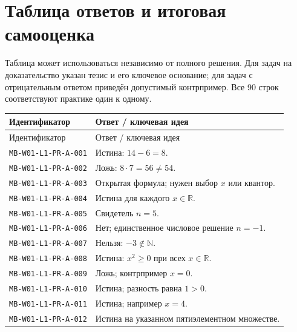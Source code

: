 \documentclass[11pt,a4paper,openany]{book}
\newcommand{\muid}[1]{\texttt{\footnotesize #1}}
\begin{document}
\chapter{Таблица ответов и итоговая самооценка}
\begin{keybox}Таблица может использоваться независимо от полного решения. Для задач на доказательство указан тезис и его ключевое основание; для задач с отрицательным ответом приведён допустимый контрпример. Все 90 строк соответствуют практике один к одному.\end{keybox}
\small
\begin{longtable}{p{}p{}}\toprule Идентификатор & Ответ / ключевая идея\\\midrule\endfirsthead\toprule Идентификатор & Ответ / ключевая идея\\\midrule\endhead

\muid{MB-W01-L1-PR-A-001} & Истина: $14-6=8$.\\

\muid{MB-W01-L1-PR-A-002} & Ложь: $8\cdot7=56\ne54$.\\

\muid{MB-W01-L1-PR-A-003} & Открытая формула; нужен выбор $x$ или квантор.\\

\muid{MB-W01-L1-PR-A-004} & Истина для каждого $x\in\mathbb R$.\\

\muid{MB-W01-L1-PR-A-005} & Свидетель $n=5$.\\

\muid{MB-W01-L1-PR-A-006} & Нет; единственное числовое решение $n=-1$.\\

\muid{MB-W01-L1-PR-A-007} & Нельзя: $-3\notin\mathbb N$.\\

\muid{MB-W01-L1-PR-A-008} & Истина: $x^2\ge0$ при всех $x\in\mathbb R$.\\

\muid{MB-W01-L1-PR-A-009} & Ложь; контрпример $x=0$.\\

\muid{MB-W01-L1-PR-A-010} & Истина; разность равна $1>0$.\\

\muid{MB-W01-L1-PR-A-011} & Истина; например $x=4$.\\

\muid{MB-W01-L1-PR-A-012} & Истина на указанном пятиэлементном множестве.\\


\end{longtable}
\end{document}
